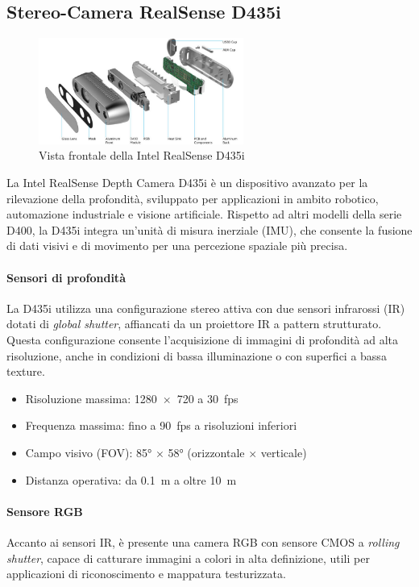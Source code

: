 \documentclass[11pt]{report}
\begin{document}
\subsection{Stereo-Camera RealSense D435i}

\begin{figure}[H]
    \centering
    \includegraphics[width=0.6\textwidth]{images/d435i}
    \caption{Vista frontale della Intel RealSense D435i}
    \label{fig:d435i}
\end{figure}

La Intel RealSense Depth Camera D435i è un dispositivo avanzato per la rilevazione della profondità, sviluppato per applicazioni in ambito robotico, automazione industriale e visione artificiale. Rispetto ad altri modelli della serie D400, la D435i integra un’unità di misura inerziale (IMU), che consente la fusione di dati visivi e di movimento per una percezione spaziale più precisa.

\paragraph{Sensori di profondità}  
La D435i utilizza una configurazione stereo attiva con due sensori infrarossi (IR) dotati di \emph{global shutter}, affiancati da un proiettore IR a pattern strutturato. Questa configurazione consente l’acquisizione di immagini di profondità ad alta risoluzione, anche in condizioni di bassa illuminazione o con superfici a bassa texture.

\begin{itemize}
  \item Risoluzione massima: 1280~$\times$~720 a 30~fps
  \item Frequenza massima: fino a 90~fps a risoluzioni inferiori
  \item Campo visivo (FOV): 85° $\times$ 58° (orizzontale $\times$ verticale)
  \item Distanza operativa: da 0.1~m a oltre 10~m
\end{itemize}

\paragraph{Sensore RGB}  
Accanto ai sensori IR, è presente una camera RGB con sensore CMOS a \emph{rolling shutter}, capace di catturare immagini a colori in alta definizione, utili per applicazioni di riconoscimento e mappatura testurizzata.
\end{document}
